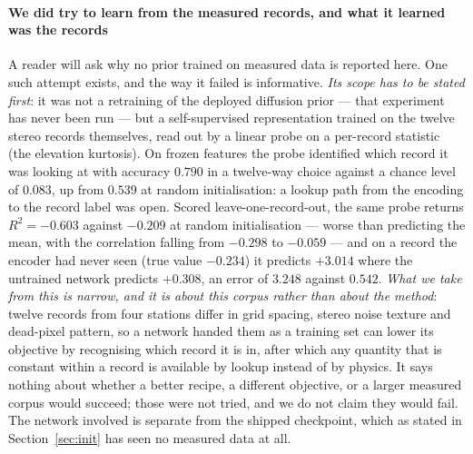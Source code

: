 \documentclass[review]{elsarticle}
\begin{document}
\paragraph{We did try to learn from the measured records, and what it learned was the
records} A reader will ask why no prior trained on measured data is reported here. One
such attempt exists, and the way it failed is informative. \emph{Its scope has to be
stated first}: it was not a retraining of the deployed diffusion prior --- that
experiment has never been run --- but a self-supervised representation trained on the
twelve stereo records themselves, read out by a linear probe on a per-record statistic
(the elevation kurtosis). On frozen features the probe identified which record it was
looking at with accuracy $0.790$ in a twelve-way choice against a chance level of
$0.083$, up from $0.539$ at random initialisation: a lookup path from the encoding to
the record label was open. Scored leave-one-record-out, the same probe returns
$R^2 = -0.603$ against $-0.209$ at random initialisation --- worse than predicting the
mean, with the correlation falling from $-0.298$ to $-0.059$ --- and on a record the
encoder had never seen (true value $-0.234$) it predicts $+3.014$ where the untrained
network predicts $+0.308$, an error of $3.248$ against $0.542$. \emph{What we take from
this is narrow, and it is about this corpus rather than about the method}: twelve
records from four stations differ in grid spacing, stereo noise texture and dead-pixel
pattern, so a network handed them as a training set can lower its objective by
recognising which record it is in, after which any quantity that is constant within a
record is available by lookup instead of by physics. It says nothing about whether a
better recipe, a different objective, or a larger measured corpus would succeed; those
were not tried, and we do not claim they would fail. The network involved is separate
from the shipped checkpoint, which as stated in Section~\ref{sec:init} has seen no
measured data at all.

\end{document}
